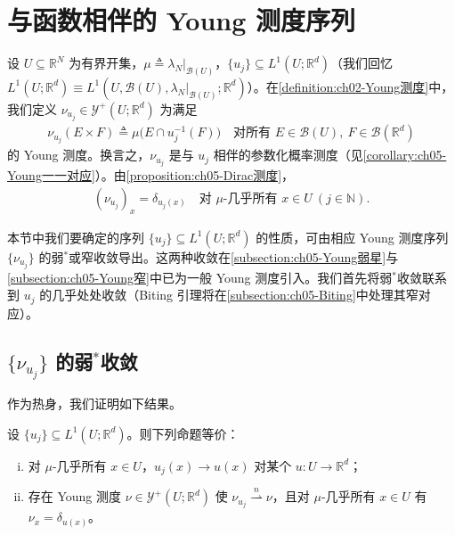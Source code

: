 \documentclass[../../main.tex]{subfiles}%
\begin{document}
\section{与函数相伴的 Young 测度序列}\label{section:ch05-收敛}

设 $U\subseteq\mathbb{R}^N$ 为有界开集，$\mu\triangleq \lambda_N|_{\mathscr{B}(U)}$，$\{u_j\}\subseteq L^1(U;\mathbb{R}^d)$（我们回忆 $L^1(U;\mathbb{R}^d)\equiv L^1(U,\mathscr{B}(U),\lambda_N|_{\mathscr{B}(U)};\mathbb{R}^d)$）。在\cref{definition:ch02-Young测度}中，我们定义 $\nu_{u_j}\in\mathcal{Y}^+(U;\mathbb{R}^d)$ 为满足
\begin{align*}
\nu_{u_j}(E\times F)\triangleq \mu\big(E\cap u_j^{-1}(F)\big)
\quad\text{对所有 }E\in\mathscr{B}(U),\ F\in\mathscr{B}(\mathbb{R}^d)
\end{align*}
的 Young 测度。换言之，$\nu_{u_j}$ 是与 $u_j$ 相伴的参数化概率测度（见\cref{corollary:ch05-Young一一对应}）。由\cref{proposition:ch05-Dirac测度}，
\begin{align}
(\nu_{u_j})_x=\delta_{u_j(x)}
\quad\text{对 }\mu\text{-几乎所有 }x\in U\ (j\in\mathbb{N}).\label{align:ch05-5.66}
\end{align}

本节中我们要确定的序列 $\{u_j\}\subseteq L^1(U;\mathbb{R}^d)$ 的性质，可由相应 Young 测度序列 $\{\nu_{u_j}\}$ 的弱$^*$或窄收敛导出。这两种收敛在\cref{subsection:ch05-Young弱星}与\cref{subsection:ch05-Young窄}中已为一般 Young 测度引入。我们首先将弱$^*$收敛联系到 $u_j$ 的几乎处处收敛（Biting 引理将在\cref{subsection:ch05-Biting}中处理其窄对应）。

\subsection{$\{\nu_{u_j}\}$ 的弱$^*$收敛}

作为热身，我们证明如下结果。

\begin{proposition}\label{proposition:ch05-几乎处处收敛}
设 $\{u_j\}\subseteq L^1(U;\mathbb{R}^d)$。则下列命题等价：
\begin{enumerate}[(i)]
\item\label{item:ch05-ae-i} 对 $\mu$-几乎所有 $x\in U$，$u_j(x)\to u(x)$ 对某个 $u:U\to\mathbb{R}^d$；
\item\label{item:ch05-ae-ii} 存在 Young 测度 $\nu\in\mathcal{Y}^+(U;\mathbb{R}^d)$ 使 $\nu_{u_j}\stackrel{n}{\rightharpoonup}\nu$，且对 $\mu$-几乎所有 $x\in U$ 有 $\nu_x=\delta_{u(x)}$。
\end{enumerate}
\end{proposition}
\end{document}

